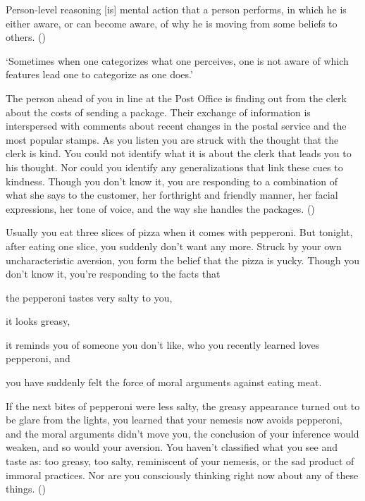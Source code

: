 \documentclass[10pt]{article}
\begin{document}
\begin{description}[font=\bfseries, leftmargin=.75cm, style=nextline]
\item[Self-awareness condition] Person-level reasoning [is] mental action that a person performs, in which he is either aware, or can become aware, of why he is moving from some beliefs to others.\nolinebreak
  \mbox{}\hfill\mbox{(\citeyear[16]{Boghossian:2014aa})}
\end{description}





`Sometimes when one categorizes what one perceives, one is not aware of which features lead one to categorize as one does.' \citeyear[9]{Siegel:2019aa}

\begin{scenario}[Kindness]
  The person ahead of you in line at the Post Office is finding out from the clerk about the costs of sending a package. Their exchange of information is interspersed with comments about recent changes in the postal service and the most popular stamps. As you listen you are struck with the thought that the clerk is kind. You could not identify what it is about the clerk that leads you to his thought. Nor could you identify any generalizations that link these cues to kindness. Though you don’t know it, you are responding to a combination of what she says to the customer, her forthright and friendly manner, her facial expressions, her tone of voice, and the way she handles the packages.\nolinebreak
  \mbox{}\hfill\mbox{(\citeyear[9--10]{Siegel:2019aa})}
\end{scenario}


\begin{scenario}[Pepperoni]
  Usually you eat three slices of pizza when it comes with pepperoni.
  But tonight, after eating one slice, you suddenly don't want any more.
  Struck by your own uncharacteristic aversion, you form the belief that the pizza is yucky.
  Though you don't know it, you’re responding to the facts that
  \begin{enumerate*}[label=(\roman*)]
  \item the pepperoni tastes very salty to you,
  \item it looks greasy,
  \item it reminds you of someone you don’t like, who you recently learned loves pepperoni, and
  \item you have suddenly felt the force of moral arguments against eating meat.
  \end{enumerate*}
  If the next bites of pepperoni were less salty, the greasy appearance turned out to be glare from the lights, you learned that your nemesis now avoids pepperoni, and the moral arguments didn't move you, the conclusion of your inference would weaken, and so would your aversion.
  You haven't classified what you see and taste as: too greasy, too salty, reminiscent of your nemesis, or the sad product of immoral practices.
  Nor are you consciously thinking right now about any of these things.\nolinebreak
  \mbox{}\hfill\mbox{(\citeyear[11]{Siegel:2019aa})}
\end{scenario}
\end{document}
